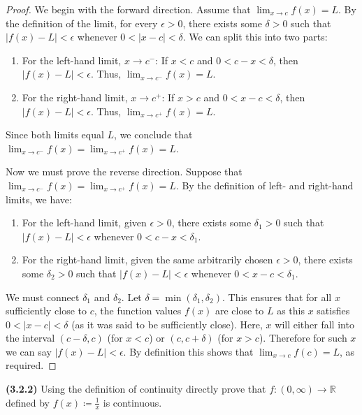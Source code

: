 \documentclass[12pt]{article}
\newcommand{\limit}[1]{\displaystyle \lim_{ {#1} }}
\newcommand{\abs}[1]{\left| {#1} \right|}
\newcommand{\paren}[1]{\left( {#1} \right)}
\newcommand{\bR}{\mathbb{R}}
\begin{document}
\begin{proof}
	We begin with the forward direction. Assume that $\limit{x\to c}f(x)=L$. By the definition of the limit, for every $\epsilon>0$, there exists some $\delta>0$ such that $\abs{f(x)-L}<\epsilon$ whenever $0<\abs{x-c}<\delta$. We can split this into two parts:
	
\begin{enumerate}
	\item For the left-hand limit, $x\to c^-$: If $x<c$ and $0<c-x<\delta$, then $\abs{f(x)-L}<\epsilon$. Thus, $\limit{x\to c^-}f(x)=L$.
	\item For the right-hand limit,  $x\to c^+$: If $x>c$ and $0<x-c<\delta$, then $\abs{f(x)-L}<\epsilon$. Thus, $\limit{x\to c^+}f(x)=L$.
\end{enumerate}

\noindent Since both limits equal $L$, we conclude that $\limit{x\to c^-}f(x)=\limit{x\to c^+}f(x)=L$.

\indent Now we must prove the reverse direction. Suppose that $\limit{x\to c^-}f(x)=\limit{x\to c^+}f(x)=L$. By the definition of left- and right-hand limits, we have:

\begin{enumerate}
	\item For the left-hand limit, given $\epsilon>0$, there exists some $\delta_1>0$ such that $\abs{f(x)-L}<\epsilon$ whenever $0<c-x<\delta_1$.
	\item For the right-hand limit, given the same arbitrarily chosen $\epsilon>0$, there exists some $\delta_2>0$ such that $\abs{f(x)-L}<\epsilon$ whenever $0<x-c<\delta_1$.
\end{enumerate}

\indent We must connect $\delta_1$ and $\delta_2$. Let $\delta = \min\paren{\delta_1,\delta_2}$. This ensures that for all $x$ sufficiently close to $c$, the function values $f(x)$ are close to $L$ as this $x$ satisfies $0<\abs{x-c}<\delta$ (as it was said to be sufficiently close). Here, $x$ will either fall into the interval $\paren{c-\delta, c}$ (for $x<c$) or $\paren{c,c+\delta}$ (for $x>c$). Therefore for such $x$ we can say $\abs{f(x)-L}<\epsilon$. By definition this shows that $\limit{x\to c}f(c)=L$, as required.
\end{proof}

\newpage

\noindent \textbf{(3.2.2)} Using the definition of continuity directly prove that $f:\paren{0,\infty}\to\bR$ defined by $f(x)\coloneq\frac{1}{x}$ is continuous.
\end{document}

